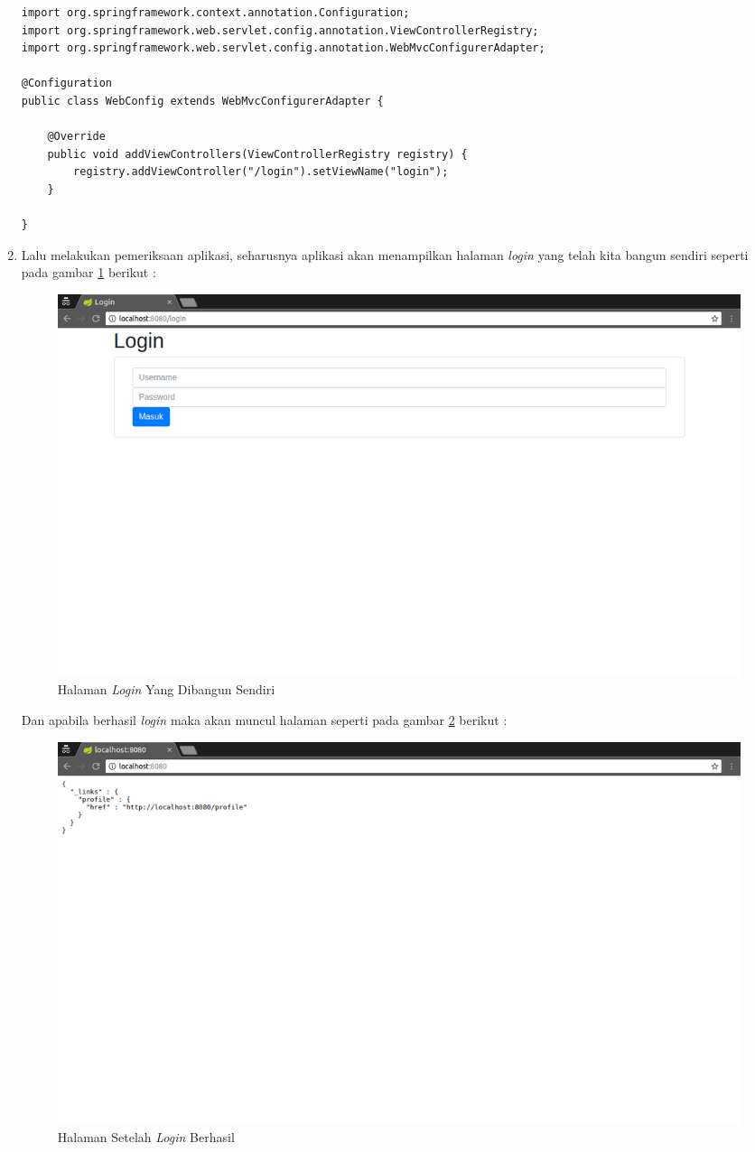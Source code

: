 \begin{enumerate}
\begin{lstlisting}
import org.springframework.context.annotation.Configuration;
import org.springframework.web.servlet.config.annotation.ViewControllerRegistry;
import org.springframework.web.servlet.config.annotation.WebMvcConfigurerAdapter;

@Configuration
public class WebConfig extends WebMvcConfigurerAdapter {

	@Override
	public void addViewControllers(ViewControllerRegistry registry) {
		registry.addViewController("/login").setViewName("login");
	}

}
	\end{lstlisting}
	
	\item Lalu melakukan pemeriksaan aplikasi, seharusnya aplikasi akan menampilkan halaman \textit{login} yang telah kita bangun sendiri seperti pada gambar \ref{fig:halaman-login} berikut :
	
	\begin{figure}[H]
		\centering
		\includegraphics[width=1\textwidth]{./resources/024-halaman-login}
		\caption{Halaman \textit{Login} Yang Dibangun Sendiri}
		\label{fig:halaman-login}
	\end{figure}
	
	Dan apabila berhasil \textit{login} maka akan muncul halaman seperti pada gambar \ref{fig:halaman-utama} berikut :
	
	\begin{figure}[H]
		\centering
		\includegraphics[width=1\textwidth]{./resources/025-halaman-utama}
		\caption{Halaman Setelah \textit{Login} Berhasil}
		\label{fig:halaman-utama}
	\end{figure}	
	
\end{enumerate}


